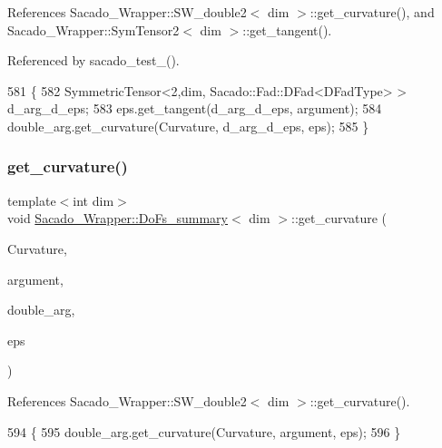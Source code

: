 References Sacado\+\_\+\+Wrapper\+::\+S\+W\+\_\+double2$<$ dim $>$\+::get\+\_\+curvature(), and Sacado\+\_\+\+Wrapper\+::\+Sym\+Tensor2$<$ dim $>$\+::get\+\_\+tangent().



Referenced by sacado\+\_\+test\+\_().


\begin{DoxyCode}
581     \{
582         SymmetricTensor<2,dim, Sacado::Fad::DFad<DFadType> > d\_arg\_d\_eps;
583         eps.get\_tangent(d\_arg\_d\_eps, argument);
584         double\_arg.get\_curvature(Curvature, d\_arg\_d\_eps, eps);
585     \}
\end{DoxyCode}
\mbox{\label{classSacado__Wrapper_1_1DoFs__summary_abc10231129de5c52fd9aba22701aa5fa}} 
\subsubsection{\texorpdfstring{get\+\_\+curvature()}{get\_curvature()}\hspace{0.1cm}{\footnotesize\ttfamily [2/2]}}
{\footnotesize\ttfamily template$<$int dim$>$ \\
void \hyperlink{classSacado__Wrapper_1_1DoFs__summary}{Sacado\+\_\+\+Wrapper\+::\+Do\+Fs\+\_\+summary}$<$ dim $>$\+::get\+\_\+curvature (\begin{DoxyParamCaption}\item[{Symmetric\+Tensor$<$ 2, dim $>$ \&}]{Curvature,  }\item[{Sacado\+::\+Fad\+::\+D\+Fad$<$ \hyperlink{Sacado__Wrapper_8h_a7e0893207b87dad05c66a34baac8ed2e}{D\+Fad\+Type} $>$ \&}]{argument,  }\item[{\hyperlink{classSacado__Wrapper_1_1SW__double2}{S\+W\+\_\+double2}$<$ dim $>$ \&}]{double\+\_\+arg,  }\item[{\hyperlink{classSacado__Wrapper_1_1SymTensor2}{Sym\+Tensor2}$<$ dim $>$ \&}]{eps }\end{DoxyParamCaption})}



References Sacado\+\_\+\+Wrapper\+::\+S\+W\+\_\+double2$<$ dim $>$\+::get\+\_\+curvature().


\begin{DoxyCode}
594     \{
595         double\_arg.get\_curvature(Curvature, argument, eps);
596     \}
\end{DoxyCode}
\mbox{\label{classSacado__Wrapper_1_1DoFs__summary_ae273d0fa3197118a11d7005523e27d8a}} 
